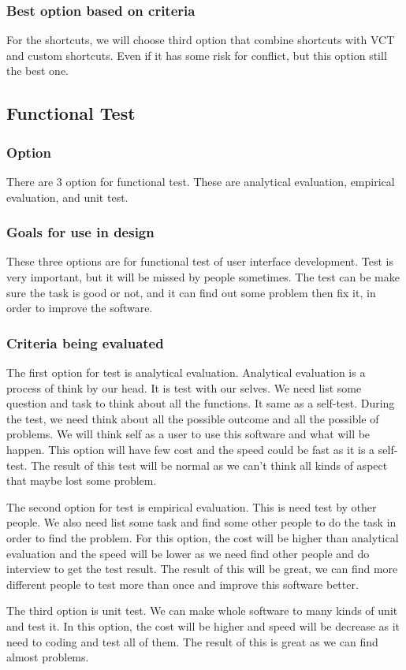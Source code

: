 \documentclass [10pt]{article}
\begin{document}
\subsubsection{Best option based on criteria}
For the shortcuts, we will choose third option that combine shortcuts with VCT and custom shortcuts. Even if it has some risk for conflict, but this option still the best one. 

\subsection{Functional Test}

\subsubsection{Option}
There are 3 option for functional test. These are analytical evaluation, empirical evaluation, and unit test.

\subsubsection{Goals for use in design}
These three options are for functional test of user interface development. Test is very important, but it will be missed by people sometimes. The test can be make sure the task is good or not, and it can find out some problem then fix it, in order to improve the software.

\subsubsection{Criteria being evaluated}
The first option for test is analytical evaluation. Analytical evaluation is a process of think by our head. It is test with our selves. We need list some question and task to think about all the functions. It same as a self-test. During the test, we need think about all the possible outcome and all the possible of problems. We will think self as a user to use this software and what will be happen. This option will have few cost and the speed could be fast as it is a self-test. The result of this test will be normal as we can’t think all kinds of aspect that maybe lost some problem. \par
The second option for test is empirical evaluation. This is need test by other people. We also need list some task and find some other people to do the task in order to find the problem. For this option, the cost will be higher than analytical evaluation and the speed will be lower as we need find other people and do interview to get the test result. The result of this will be great, we can find more different people to test more than once and improve this software better. \par
The third option is unit test. We can make whole software to many kinds of unit and test it. In this option, the cost will be higher and speed will be decrease as it need to coding and test all of them. The result of this is great as we can find almost problems.
\end{document}
